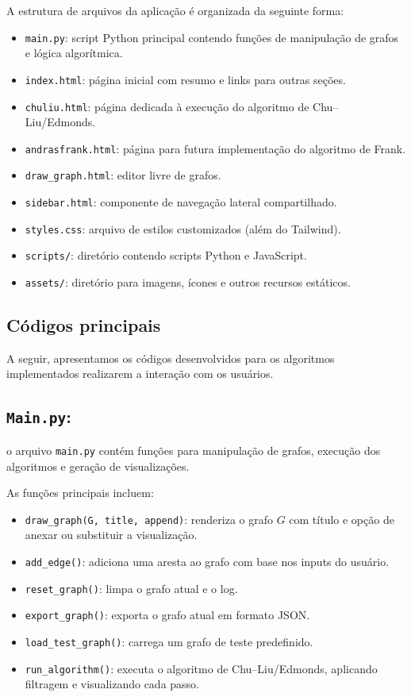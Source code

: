 A estrutura de arquivos da aplicação é organizada da seguinte forma:
\begin{itemize}\setlength{\itemsep}{2pt}
	\item \texttt{main.py}: script Python principal contendo funções de manipulação de grafos e lógica algorítmica.
	\item \texttt{index.html}: página inicial com resumo e links para outras seções.
	\item \texttt{chuliu.html}: página dedicada à execução do algoritmo de Chu--Liu/Edmonds.
	\item \texttt{andrasfrank.html}: página para futura implementação do algoritmo de Frank.
	\item \texttt{draw\_graph.html}: editor livre de grafos.
	\item \texttt{sidebar.html}: componente de navegação lateral compartilhado.
	\item \texttt{styles.css}: arquivo de estilos customizados (além do Tailwind).
	\item \texttt{scripts/}: diretório contendo scripts Python e JavaScript.
	\item \texttt{assets/}: diretório para imagens, ícones e outros recursos estáticos.
\end{itemize}

\subsection{Códigos principais}

A seguir, apresentamos os códigos desenvolvidos para os algoritmos implementados realizarem a interação com os usuários.

\subsection{\texttt{Main.py}:} o arquivo \texttt{main.py} contém funções para manipulação de grafos, execução dos algoritmos e geração de visualizações.


As funções principais incluem:
\begin{itemize}\setlength{\itemsep}{2pt}
	\item \texttt{draw\_graph(G, title, append)}: renderiza o grafo \(G\) com título e opção de anexar ou substituir a visualização.
	\item \texttt{add\_edge()}: adiciona uma aresta ao grafo com base nos inputs do usuário.
	\item \texttt{reset\_graph()}: limpa o grafo atual e o log.
	\item \texttt{export\_graph()}: exporta o grafo atual em formato JSON.
	\item \texttt{load\_test\_graph()}: carrega um grafo de teste predefinido.
	\item \texttt{run\_algorithm()}: executa o algoritmo de Chu--Liu/Edmonds, aplicando filtragem e visualizando cada passo.
\end{itemize}

